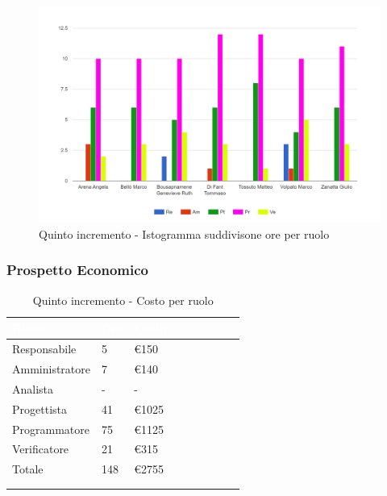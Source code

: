 {{      \begin{figure}[H]
        \includegraphics[width=15cm]{sezioni/Images/quinto.png}
        \centering
        \caption{Quinto incremento - Istogramma suddivisone ore per ruolo}
     \end{figure}
    }

    \subsubsection{Prospetto Economico}
    {
        \setlength{\freewidth}{\dimexpr\textwidth-30\tabcolsep}
        \renewcommand{\arraystretch}{1.0}
        \setlength{\aboverulesep}{0pt}
        \setlength{\belowrulesep}{0pt}
        \begin{longtable}{C{.4\freewidth} C{.2\freewidth} C{.2\freewidth} C{.2\freewidth} C{.2\freewidth} C{.2\freewidth} C{.2\freewidth} C{.2\freewidth} C{.2\freewidth}}
          \toprule
        \textcolor{white}{\textbf{Ruolo}}&
        \textcolor{white}{\textbf{Ore}}&
        \textcolor{white}{\textbf{Costo}}\\
        \toprule
        \endhead
            
        Responsabile  & 5 & €150\\
        Amministratore  & 7 & €140 \\
        Analista &- & -\\
        Progettista &41 &€1025\\
        Programmatore &75 & €1125\\
        Verificatore &21 &€315\\
        Totale&148&€2755\\
        \bottomrule
      \\
        \caption{Quinto incremento - Costo per ruolo}


\end{longtable}}}
